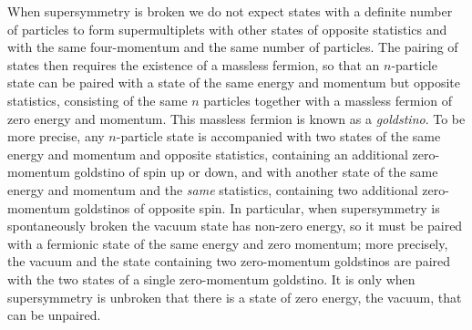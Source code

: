 When supersymmetry is broken we do not expect states with a definite
number of particles to form supermultiplets with other states of opposite
statistics and with the same four-momentum and the same number of
particles. The pairing of states then requires the existence of a massless
fermion, so that an \(n\)-particle state can be paired with a state of the
same energy and momentum but opposite statistics, consisting of the same
\(n\) particles together with a massless fermion of zero energy and
momentum. This massless fermion is known as a \emph{goldstino}. To be more
precise, any \(n\)-particle state is accompanied with two states of the
same energy and momentum and opposite statistics, containing an
additional zero-momentum goldstino of spin up or down, and with another
state of the same energy and momentum and the \emph{same} statistics,
containing two additional zero-momentum goldstinos of opposite spin. In
particular, when supersymmetry is spontaneously broken the vacuum state
has non-zero energy, so it must be paired with a fermionic state of the
same energy and zero momentum; more precisely, the vacuum and the state
containing two zero-momentum goldstinos are paired with the two states of
a single zero-momentum goldstino. It is only when supersymmetry is
unbroken that there is a state of zero energy, the vacuum, that can be
unpaired.

